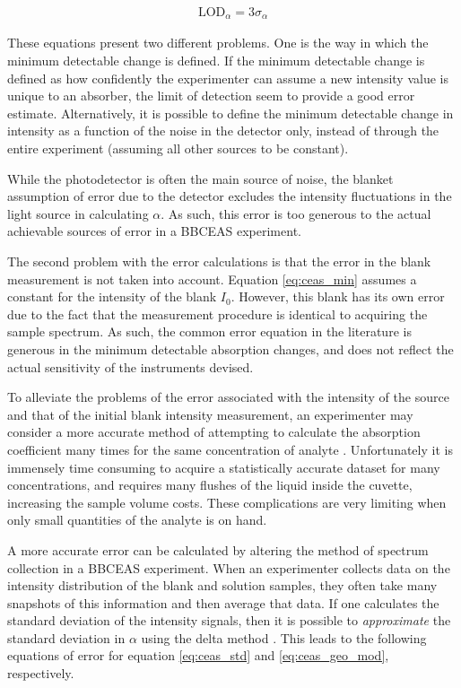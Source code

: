 \begin{align}
  \text{LOD}_{\alpha} = 3\sigma_{\alpha}\label{eq:lod}
\end{align}

These equations present two different problems. One is the way in which the
minimum detectable change is defined. If the minimum detectable change is
defined as how confidently the experimenter can assume a new intensity value
is unique to an absorber, the limit of detection seem to provide a good error
estimate. Alternatively, it is possible to define the minimum detectable
change in intensity as a function of the noise in the detector only, instead
of through the entire experiment (assuming all other sources to be constant).


While the photodetector is often the main source of noise, the blanket
assumption of error due to the detector excludes the intensity fluctuations in
the light source in calculating $\alpha$. As such, this error is too generous
to the actual achievable sources of error in a \ac{BBCEAS} experiment.

The second problem with the error calculations is that the error in the blank
measurement is not taken into account. Equation \eqref{eq:ceas_min} assumes a
constant for the intensity of the blank $I_0$. However, this blank has its own
error due to the fact that the measurement procedure is identical to acquiring
the sample spectrum. As such, the common error equation in the literature is
generous in the minimum detectable absorption changes, and does not reflect
the actual sensitivity of the instruments devised.

To alleviate the problems of the error associated with the intensity
of the source and that of the initial blank intensity measurement, an
experimenter may consider a more accurate method of attempting to calculate
the absorption coefficient many times for the same concentration of analyte
\cite{Islam:2007ea}. Unfortunately it is immensely time consuming to acquire
a statistically accurate dataset for many concentrations, and requires many
flushes of the liquid inside the cuvette, increasing the sample volume costs.
These complications are very limiting when only small quantities of the
analyte is on hand.

A more accurate error can be calculated by altering the method of spectrum
collection in a \ac{BBCEAS} experiment. When an experimenter collects data
on the intensity distribution of the blank and solution samples, they often
take many snapshots of this information and then average that data. If one
calculates the standard deviation of the intensity signals, then it is
possible to \emph{approximate} the standard deviation in $\alpha$ using the
delta method \cite{Casella:2002tp}. This leads to the following equations
of error for equation \eqref{eq:ceas_std} and \eqref{eq:ceas_geo_mod},
respectively.

